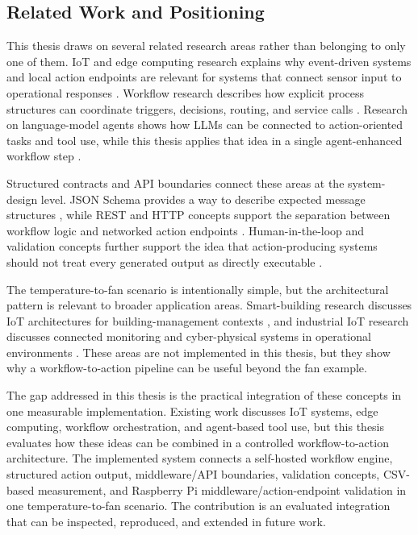 \subsection{Related Work and Positioning}\label{subsec:related-work-positioning}

This thesis draws on several related research areas rather than belonging to only one of them. IoT and edge computing research explains why event-driven systems and local action endpoints are relevant for systems that connect sensor input to operational responses \cite{iotSurveyAtzori,edgeComputingSatyanarayanan}. Workflow research describes how explicit process structures can coordinate triggers, decisions, routing, and service calls \cite{workflowPatternsAalst}. Research on language-model agents shows how LLMs can be connected to action-oriented tasks and tool use, while this thesis applies that idea in a single agent-enhanced workflow step \cite{reactYao2023}.


Structured contracts and API boundaries connect these areas at the system-design level. JSON Schema provides a way to describe expected message structures \cite{jsonSchemaDocs}, while REST and HTTP concepts support the separation between workflow logic and networked action endpoints \cite{fieldingRest2000,httpSemanticsRfc9110}. Human-in-the-loop and validation concepts further support the idea that action-producing systems should not treat every generated output as directly executable \cite{humanInTheLoopAmershi2014}.

The temperature-to-fan scenario is intentionally simple, but the architectural pattern is relevant to broader application areas. Smart-building research discusses IoT architectures for building-management contexts \cite{smartBuildingsMinoli2017}, and industrial IoT research discusses connected monitoring and cyber-physical systems in operational environments \cite{industrialIotXu2018}. These areas are not implemented in this thesis, but they show why a workflow-to-action pipeline can be useful beyond the fan example.


The gap addressed in this thesis is the practical integration of these concepts in one measurable implementation. Existing work discusses IoT systems, edge computing, workflow orchestration, and agent-based tool use, but this thesis evaluates how these ideas can be combined in a controlled workflow-to-action architecture. The implemented system connects a self-hosted workflow engine, structured action output, middleware/API boundaries, validation concepts, CSV-based measurement, and Raspberry Pi middleware/action-endpoint validation in one temperature-to-fan scenario. The contribution is an evaluated integration that can be inspected, reproduced, and extended in future work.



